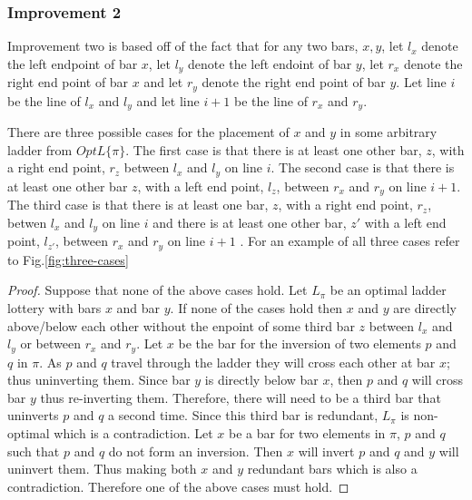 \subsubsection{Improvement 2}
Improvement two is based off of the fact that for any two bars,
$x,y$, let $l_{x}$ denote the left endpoint of bar $x$, let 
$l_{y}$ denote the left endoint of bar $y$, let $r_{x}$ denote 
the right end point of bar $x$ and let $r_{y}$ denote the right 
end point of bar $y$. Let line $i$ be the line of $l_{x}$ and $l_{y}$
and let line $i+1$ be the line of $r_{x}$ and $r_{y}$.
\begin{lemma}
There are three possible cases for the placement of $x$ and $y$ in some arbitrary ladder from $OptL\{\pi\}$. 
The first case is that there 
is at least one other bar, $z$, with a right end point, $r_{z}$ between $l_{x}$
and $l_{y}$ on line $i$. The second case is that there is at least one other bar 
$z$, with a left end point, $l_{z}$, between $r_{x}$ and $r_{y}$ on line $i+1$. 
The third case is that there is at least one bar, $z$, with a right end point, 
$r_{z}$, betwen $l_{x}$ and $l_{y}$ on line $i$ and there is at least one other bar, 
$z\prime$ with a left end point, $l_{z\prime}$, between $r_{x}$ and $r_{y}$ on line $i+1$ \cite{A5}. 
For an example of all three cases refer to Fig.\ref{fig:three-cases}\par
\end{lemma}
\begin{proof}
    Suppose that none of the above cases hold. Let $L_{\pi}$ be an 
    optimal ladder lottery with bars $x$ and 
    bar $y$. If none of the cases hold then $x$ and $y$ are directly above/below each other without 
    the enpoint of some third bar $z$ between $l_{x}$ and $l_{y}$ or between $r_{x}$ and $r_{y}$.
    Let $x$ be the bar for the inversion of two elements $p$ and $q$ in $\pi$. 
    As $p$ and $q$ travel through the ladder they will cross each other at bar $x$; 
    thus uninverting them. Since bar $y$ is directly below bar $x$, then $p$ and $q$ will cross 
    bar $y$ thus re-inverting them. Therefore, there will need to be a third 
    bar that uninverts $p$ and $q$ a second time. Since this third bar is 
    redundant, $L_{\pi}$ is non-optimal which is a contradiction. Let $x$ be a bar for two 
    elements in $\pi$, $p$ and $q$ such that $p$ and $q$ do not form an inversion. Then $x$ 
    will invert $p$ and $q$ and $y$ will uninvert them. Thus making both $x$ and $y$ redundant
    bars which is also a contradiction. Therefore one of the above cases must hold.
\end{proof}

